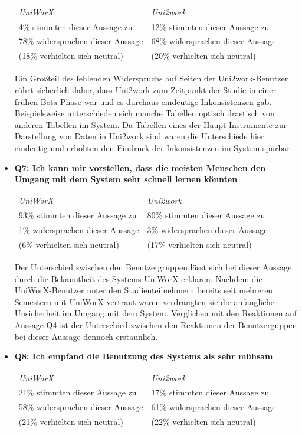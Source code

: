 \documentclass[11pt,a4paper,twoside,ngerman]{article}
\begin{document}
\begin{itemize}
    \smallskip
    \begin{tabular}{p{6.5cm}|p{6.5cm}}
        \textit{UniWorX} & \textit{Uni2work} \\
        4\% stimmten dieser Aussage zu & 12\% stimmten dieser Aussage zu \\
        78\% widersprachen dieser Aussage & 68\% widersprachen dieser Aussage \\
        (18\% verhielten sich neutral) &  (20\% verhielten sich neutral)
    \end{tabular}
    
    \smallskip
    Ein Großteil des fehlenden Widerspruchs auf Seiten der Uni2work-Benutzer rührt sicherlich daher, dass Uni2work zum Zeitpunkt der Studie in einer frühen Beta-Phase war und es durchaus eindeutige Inkonsistenzen gab. Beispielsweise unterschieden sich manche Tabellen optisch drastisch von anderen Tabellen im System. Da Tabellen eines der Haupt-Instrumente zur Darstellung von Daten in Uni2work sind waren die Unterschiede hier eindeutig und erhöhten den Eindruck der Inkonsistenzen im System spürbar.
    \item \textbf{Q7: Ich kann mir vorstellen, dass die meisten Menschen den Umgang mit dem System sehr schnell lernen könnten}
    
    \smallskip
    \begin{tabular}{p{6.5cm}|p{6.5cm}}
        \textit{UniWorX} & \textit{Uni2work} \\
        93\% stimmten dieser Aussage zu & 80\% stimmten dieser Aussage zu \\
        1\% widersprachen dieser Aussage & 3\% widersprachen dieser Aussage \\
        (6\% verhielten sich neutral) &  (17\% verhielten sich neutral)
    \end{tabular}
    
    \smallskip
    Der Unterschied zwischen den Benutzergruppen lässt sich bei dieser Aussage durch die Bekanntheit des Systems UniWorX erklären. Nachdem die UniWorX-Benutzer unter den Studienteilnehmern bereits seit mehreren Semestern mit UniWorX vertraut waren verdrängten sie die anfängliche Unsicherheit im Umgang mit dem System. Verglichen mit den Reaktionen auf Aussage Q4 ist der Unterschied zwischen den Reaktionen der Benutzerguppen bei dieser Aussage dennoch erstaunlich.
    \item \textbf{Q8: Ich empfand die Benutzung des Systems als sehr mühsam}
    
    \smallskip
    \begin{tabular}{p{6.5cm}|p{6.5cm}}
        \textit{UniWorX} & \textit{Uni2work} \\
        21\% stimmten dieser Aussage zu & 17\% stimmten dieser Aussage zu \\
        58\% widersprachen dieser Aussage & 61\% widersprachen dieser Aussage \\
        (21\% verhielten sich neutral) &  (22\% verhielten sich neutral)
    \end{tabular}
    

\end{itemize}
\end{document}
